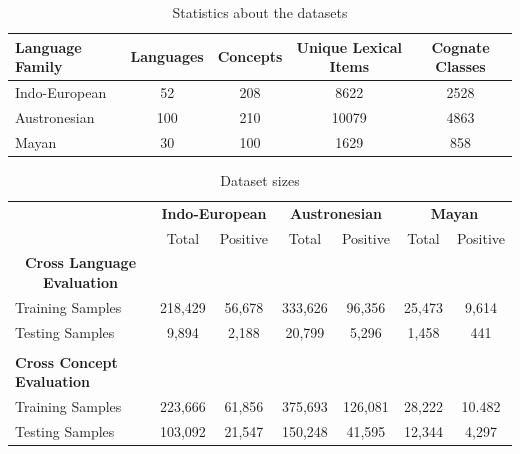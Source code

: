 \documentclass[11pt,letterpaper]{article}
\begin{document}
\begin{table}[ht]
\centering
\begin{tabular}{lcccc}
Language Family & Languages & Concepts & Unique Lexical Items & Cognate Classes \\ \hline
Indo-European   & 52        & 208      & 8622                & 2528            \\
Austronesian    & 100       & 210      & 10079                & 4863            \\
Mayan           & 30        & 100      & 1629                 & 858            
\end{tabular}
\caption{Statistics about the datasets}
\label{datastat}
\end{table}

\begin{table}[t]
\centering
\begin{tabular}{lcccccc}
\multicolumn{1}{c}{\textbf{}} & \multicolumn{2}{c}{\textbf{Indo-European}} & \multicolumn{2}{c}{\textbf{Austronesian}} & \multicolumn{2}{c}{\textbf{Mayan}} \\
\multicolumn{1}{c}{}          & Total               & Positive             & Total               & Positive            & Total           & Positive         \\
\multicolumn{1}{c}{\textbf{Cross Language Evaluation}} & \multicolumn{2}{c}{\textbf{}}               &                 &                &             &             \\
Training Samples              & 218,429             & 56,678               & 333,626             & 96,356              & 25,473          & 9,614            \\
Testing Samples               & 9,894               & 2,188                & 20,799              & 5,296               & 1,458           & 441             \\
                                                       &                      &                      &                 &                &             &             \\
\textbf{Cross Concept Evaluation}                      &                      &                      &                 &                &             &             \\
Training Samples              & 223,666             & 61,856               & 375,693             & 126,081             & 28,222          & 10.482           \\
Testing Samples               & 103,092             & 21,547               & 150,248             & 41,595              & 12,344          & 4,297                       
\end{tabular}
\caption{Dataset sizes}
\label{C_count}
\end{table}
\end{document}
